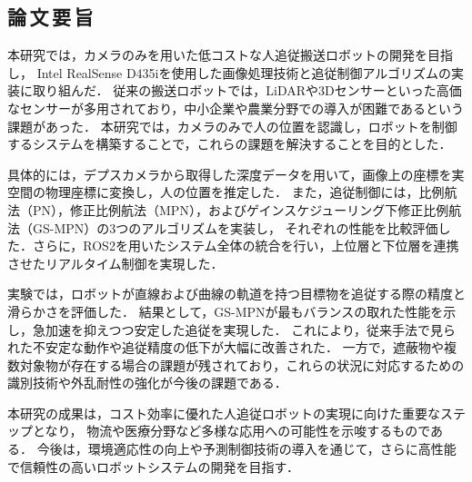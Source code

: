 \begin{center}
    \section*{論\,文\,要\,旨}                      %
\end{center}

本研究では，カメラのみを用いた低コストな人追従搬送ロボットの開発を目指し，
Intel RealSense D435iを使用した画像処理技術と追従制御アルゴリズムの実装に取り組んだ．
従来の搬送ロボットでは，LiDARや3Dセンサーといった高価なセンサーが多用されており，中小企業や農業分野での導入が困難であるという課題があった．
本研究では，カメラのみで人の位置を認識し，ロボットを制御するシステムを構築することで，これらの課題を解決することを目的とした．

具体的には，デプスカメラから取得した深度データを用いて，画像上の座標を実空間の物理座標に変換し，人の位置を推定した．
また，追従制御には，比例航法（PN），修正比例航法（MPN），およびゲインスケジューリング下修正比例航法（GS-MPN）の3つのアルゴリズムを実装し，
それぞれの性能を比較評価した．さらに，ROS2を用いたシステム全体の統合を行い，上位層と下位層を連携させたリアルタイム制御を実現した．

実験では，ロボットが直線および曲線の軌道を持つ目標物を追従する際の精度と滑らかさを評価した．
結果として，GS-MPNが最もバランスの取れた性能を示し，急加速を抑えつつ安定した追従を実現した．
これにより，従来手法で見られた不安定な動作や追従精度の低下が大幅に改善された．
一方で，遮蔽物や複数対象物が存在する場合の課題が残されており，これらの状況に対応するための識別技術や外乱耐性の強化が今後の課題である．

本研究の成果は，コスト効率に優れた人追従ロボットの実現に向けた重要なステップとなり，
物流や医療分野など多様な応用への可能性を示唆するものである．
今後は，環境適応性の向上や予測制御技術の導入を通じて，さらに高性能で信頼性の高いロボットシステムの開発を目指す．